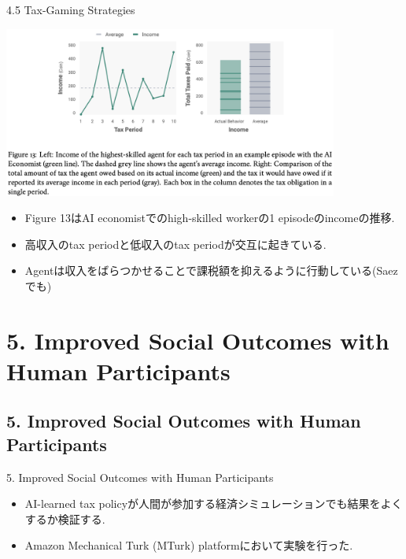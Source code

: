 \documentclass[unicode,aspectratio=169,11pt]{beamer}
\begin{document}
\begin{frame}{4.5 Tax-Gaming Strategies}{}
    \begin{center}
        \includegraphics[width=11cm]{figure13.png}
    \end{center}
    {\footnotesize\begin{itemize}
        \item Figure 13はAI economistでのhigh-skilled workerの1 episodeのincomeの推移.
        \item 高収入のtax periodと低収入のtax periodが交互に起きている.
        \item Agentは収入をばらつかせることで課税額を抑えるように行動している(Saezでも)
    \end{itemize}}
\end{frame}

\section{5. Improved Social Outcomes with Human Participants}

\subsection{5. Improved Social Outcomes with Human Participants}
\begin{frame}{5. Improved Social Outcomes with Human Participants}{}
    \begin{itemize}
        \item AI-learned tax policyが人間が参加する経済シミュレーションでも結果をよくするか検証する.
        \item Amazon Mechanical Turk (MTurk) platformにおいて実験を行った.
    \end{itemize}
\end{frame}
\end{document}
